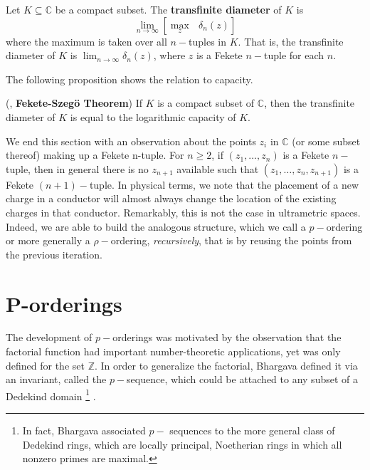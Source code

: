 \begin{definition}
Let $K \subseteq \mathbb{C}$ be a compact subset. The \textbf{transfinite diameter} of $K$ is \[ \lim_{n\to\infty} [ \max_z \text{ } \delta_n(z)]\] where the maximum is taken over all $n-$tuples in $K$. That is, the transfinite diameter of $K$ is $ \lim_{n\to\infty} \delta_n(z)$, where $z$ is a Fekete $n-$tuple for each $n$.
\end{definition}

The following proposition shows the relation to capacity.\\

\begin{proposition}
(\cite{fek}, \textbf{Fekete-Szeg\"o Theorem}) If $K$ is a compact subset of $\mathbb{C}$, then the transfinite diameter of $K$ is equal to the logarithmic capacity of $K$.
\end{proposition}



We end this section with an observation about the points $z_i$ in $\mathbb{C}$ (or some subset thereof) making up a Fekete n-tuple. For $n \geq 2$, if $(z_1,\ldots,z_{n})$ is a Fekete $n-$tuple, then in general there is no $z_{n+1}$ available such that $(z_1,\ldots,z_n, z_{n+1})$ is a Fekete $(n+1)-$tuple. In physical terms, we note that the placement of a new charge in a conductor will almost always change the location of the existing charges in that conductor. Remarkably, this is not the case in ultrametric spaces. Indeed, we are able to build the analogous structure, which we call a $p-$ordering or more generally a $\rho-$ordering, \textit{recursively}, that is by reusing the points from the previous iteration.\\ 

\section{P-orderings}

The development of $p-$orderings was motivated by the observation that the factorial function had important number-theoretic applications, yet was only defined for the set $\mathbb{Z}$. In order to generalize the factorial, Bhargava defined it via an invariant, called the $p-$sequence, which could be attached to any subset of a Dedekind domain \footnote{In fact, Bhargava associated $p-$ sequences to the more general class of Dedekind rings, which are locally principal, Noetherian rings in which all nonzero
primes are maximal.}    \cite{mb1}.\\

